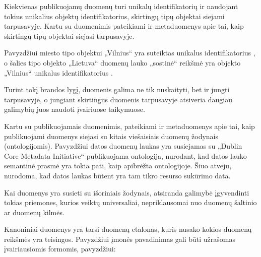 \documentclass[letterpaper,10pt,lithuanian]{sphinxmanual}
\begin{document}
\begin{description}
\begin{description}
\sphinxAtStartPar
Kiekvienas publikuojamų duomenų {\hyperref[\detokenize{savokos:term-objektas}]{}} turi unikalų
identifikatorių ir naudojant tokius unikalius objektų
identifikatorius, skirtingų tipų objektai siejami tarpusavyje.
Kartu su duomenimis pateikiami ir metaduomenys apie tai, kaip
skirtingų tipų objektai siejasi tarpusavyje.

\sphinxAtStartPar
Pavyzdžiui miesto tipo objektui „Vilnius“ yra suteiktas unikalus
identifikatorius , o šalies
tipo objekto „Lietuva“ duomenų lauko „sostinė“ reikšmė yra objekto
„Vilnius“ unikalus identifikatorius
.

\sphinxAtStartPar
Turint tokį brandos lygį, duomenis galima ne tik nuskaityti, bet ir
jungti tarpusavyje, o jungiant skirtingus duomenis tarpusavyje
atsiveria daugiau galimybių juos naudoti įvairiuose taikymuose.

\sphinxAtStartPar
Kartu su publikuojamais duomenimis, pateikiami ir metaduomenys
apie tai, kaip publikuojami duomenys siejasi su kitais viešaisiais
duomenų žodynais (ontologijomis). Pavyzdžiui datos duomenų laukas
yra susiejamas su „Dublin Core Metadata Initiative“ publikuojama
ontologija, nurodant, kad datos lauko semantinė prasmė yra tokia
pati, kaip apibrėžta  ontologijoje. Šiuo atveju,
nurodoma, kad datos laukas būtent yra tam tikro resurso sukūrimo
data.

\sphinxAtStartPar
Kai duomenys yra susieti su išoriniais žodynais, atsiranda galimybė
įgyvendinti tokias priemones, kurios veiktų universaliai,
nepriklausomai nuo duomenų šaltinio ar duomenų kilmės.

\end{description}

\sphinxAtStartPar
Kanoniniai duomenys yra tarsi duomenų etalonas, kuris nusako kokios
duomenų reikšmės yra teisingos. Pavyzdžiui įmonės pavadinimas gali būti
užrašomas įvairiausiomis formomis, pavyzdžiui:



\end{description}
\end{document}
